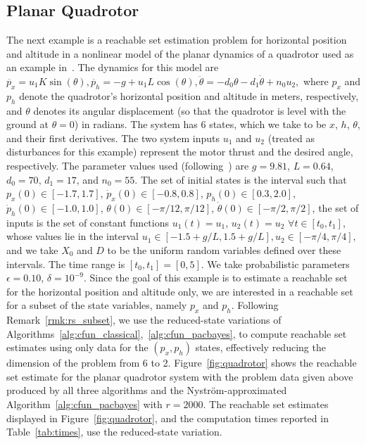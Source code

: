 \documentclass[onefignum,onetabnum]{siamart171218}
\begin{document}
\subsection{Planar Quadrotor}

The next example is a reachable set estimation problem for horizontal position
and altitude in a nonlinear model of the planar dynamics of a quadrotor used as
an example  in~\cite{mitchell2019invariant,bouffard2012board}. 
The dynamics for this model are
$
        \ddot{p_x} = u_1 K\sin(\theta),
        \ddot{p_h} = -g + u_1 L\cos(\theta),
        \ddot{\theta} = -d_0\theta - d_1\dot{\theta} + n_0 u_2, 
$
where $p_x$ and $p_h$ denote the quadrotor's horizontal position and altitude in
meters,
respectively, and $\theta$ denotes its angular displacement (so that the
quadrotor is level with the ground at $\theta=0$) in radians. 
The system has 6
states, which we take to be $x$, $h$, $\theta$, and their first derivatives. The
two system inputs $u_1$ and $u_2$ (treated as disturbances for this example) represent the motor thrust and the desired angle,
respectively. The parameter values used (following~\cite{bouffard2012board}) are $g=9.81$,
$L=0.64$, $d_0=70$, $d_1=17$, and $n_0=55$. The set of initial states is the interval such that 
        $p_x(0)\in[-1.7, 1.7]$,  $\dot{p}_x(0)\in[-0.8, 0.8]$, 
        $p_h(0)\in[0.3, 2.0]$,  $\dot{p}_h(0)\in[-1.0, 1.0]$, 
        $\theta(0)\in[-\pi/12, \pi/12]$,  $\dot{\theta}(0)\in[-\pi/2, \pi/2]$,
the set of inputs is the set of constant functions $u_1(t)=u_1$, $u_2(t)=u_2$ $\forall t\in[t_0,t_1]$, whose values lie in the
interval
        $u_1\in[-1.5+ g/L, 1.5 + g/L],  u_2\in[-\pi/4, \pi/4]$,
and we take $X_0$ and $D$ to be the uniform random variables defined over these intervals.
The time range is $[t_0,t_1]=[0,5]$. We take probabilistic parameters $\epsilon=0.10$, $\delta=10^{-9}$.
Since the goal of this example is to estimate a reachable set for the horizontal
position and altitude only, we are interested in a reachable set for a subset of
the state variables, namely $p_x$ and $p_h$.
Following Remark~\ref{rmk:rs_subset},
we use the reduced-state variations of
Algorithms~\ref{alg:cfun_classical},~\ref{alg:cfun_pacbayes},
to compute reachable set estimates using only data for the $(p_x,p_h)$ states,
effectively reducing the dimension of the problem from 6 to 2.
Figure~\ref{fig:quadrotor} shows the reachable set estimate
for the planar quadrotor system with the problem data given above produced by
all three algorithms and the Nystr\"om-approximated
Algorithm~\ref{alg:cfun_pacbayes} with $r=2000$.
The reachable set estimates displayed in Figure~\ref{fig:quadrotor}, and the
computation times reported in Table~\ref{tab:times}, use the reduced-state
variation.
\end{document}
